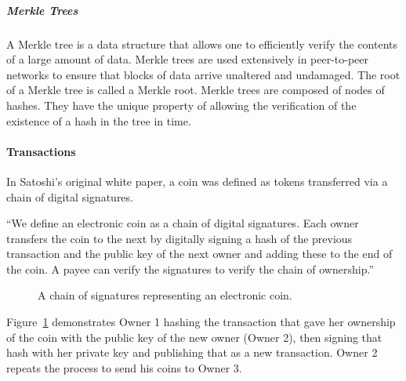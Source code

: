 \subparagraph{Merkle Trees}
A Merkle tree is a data structure that allows one to efficiently verify the
contents of a large amount of data. Merkle trees are used extensively in
peer-to-peer networks to ensure that blocks of data arrive unaltered and
undamaged. The root of a Merkle tree is called a Merkle root. Merkle trees are
composed of nodes of hashes. They have the unique property of allowing the
verification of the existence of a hash in the tree in  time.


\paragraph{Transactions}
In Satoshi's original white paper, a coin was defined as tokens transferred via
a chain of digital signatures.

\begin{displayquote}
  ``We define an electronic coin as a chain of digital signatures. Each owner
  transfers the coin to the next by digitally signing a hash of the previous
  transaction and the public key of the next owner and adding these to the end
  of the coin. A payee can verify the signatures to verify the chain of
  ownership.''\cite{bitcoin}
\end{displayquote}

\begin{figure}[H]
    \centering
    \caption{A chain of signatures representing an electronic coin.~\cite{bitcoin}}\label{fig:coin}
\end{figure}

Figure~\ref{fig:coin} demonstrates Owner 1 hashing the transaction that gave her
ownership of the coin with the public key of the new owner (Owner 2), then
signing that hash with her private key and publishing that as a new
transaction. Owner 2 repeats the process to send his coins to Owner 3.



